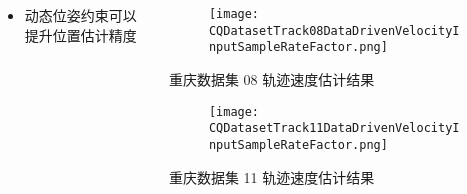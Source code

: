 \begin{frame}
\begin{columns}[t]
\begin{column}{0.6\textwidth}
{{		   	}}
			\begin{itemize}
				\item 动态位姿约束可以提升位置估计精度
			\end{itemize}
		\end{column} 
		\begin{column}{0.4\textwidth}
    		\vspace{-3.2cm}  
		   	\begin{figure}
    			\texttt{[image: CQDatasetTrack08DataDrivenVelocityInputSampleRateFactor.png]}
		   	\end{figure}
		   	\vspace{-0.5cm}
		   	\hspace{0.5cm} {\tiny 重庆数据集 08 轨迹速度估计结果}
		   	\vspace{-0.2cm}
		   	\begin{figure}
				\texttt{[image: CQDatasetTrack11DataDrivenVelocityInputSampleRateFactor.png]}
		   	\end{figure}
		   	\vspace{-0.5cm}
		   	\hspace{0.5cm} {\tiny 重庆数据集 11 轨迹速度估计结果}
		\end{column}    
	\end{columns}	
\end{frame}

